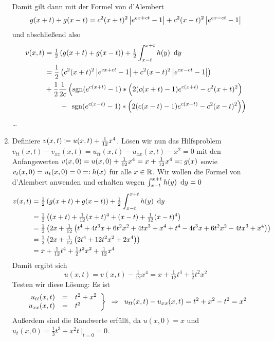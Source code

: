\begin{exercisePage}
\begin{enumerate}[label=(zu \alph*), leftmargin=*]
	Damit gilt dann mit der Formel von d'Alembert
	\begin{equation*}
		g(x+t) + g(x-t) = c^2(x+t)^2 \left| e^{cx + ct} - 1 \right| + c^2(x-t)^2 \left| e^{cx - ct} - 1 \right|
	\end{equation*}
	und abschließend also 
	\begin{align*}
		v(x,t) 
		&= \tfrac{1}{2} \brackets{g(x+t) + g(x-t)} + \tfrac{1}{2} \int_{x-t}^{x+t} h(y) \dy \\
		&= \frac{1}{2} \brackets{c^2(x+t)^2 \abs{e^{cx + ct} - 1} + c^2(x-t)^2 \abs{e^{cx - ct} - 1}}\\
		& + \frac{1}{2}  \frac{1}{2c} \left(\sgn(e^{c(x+t)} - 1) * \brackets{2 (c(x+t) - 1) e^{c(x+t)} - c^2(x+t)^2} \right. \\
		&\phantom{= \frac{1}{2}} \ - \ \left. \sgn(e^{c(x-t)} - 1) * \brackets{2 (c(x-t) - 1) e^{c(x-t)} - c^2(x-t)^2}\right)
	\end{align*}
	\dots
	
	\item Definiere $v(x,t) \coloneqq u(x,t) + \frac{1}{12}x^4$. Lösen wir nun das Hilfsproblem $v_{tt}(x,t) - v_{xx}(x,t) = u_{tt}(x,t) - u_{xx}(x,t) - x^2 = 0$ mit den Anfangswerten $v(x,0) = u(x,0) + \frac{1}{12} x^4 = x + \frac{1}{12}x^4 \mathrel{=:} g(x)$ sowie $v_t(x,0) = u_t(x,0) = 0 \mathrel{=:} h(x)$ für alle $x \in \mathbb{R}$.
	Wir wollen die Formel von d'Alembert anwenden und erhalten wegen $\int_{x-t}^{x+t} h(y) \enskip \mathrm{d}y = 0$
	\begin{align*}
		v(x,t) &= \tfrac{1}{2} \left( g(x+t) + g(x-t) \right) + \tfrac{1}{2} \int_{x-t}^{x+t} h(y) \enskip \mathrm{d}y \\
		&= \tfrac{1}{2} \left(  (x+t) + \tfrac{1}{12}(x+t)^4  + (x-t) + \tfrac{1}{12}(x-t)^4 \right) \\
		&= \tfrac{1}{2} \left( 2x + \tfrac{1}{12} \left( t^4 + 4 t^3 x + 6 t^2 x^2 + 4 t x^3 + x^4 + t^4 - 4 t^3 x + 6 t^2 x^2 - 4 t x^3 + x^4 \right) \right) \\
		&=\tfrac{1}{2} \left( 2x + \tfrac{1}{12} \left( 2t^4 + 12 t^2 x^2 + 2 x^4  \right) \right) \\
		&= x + \tfrac{1}{12}t^4 + \tfrac{1}{2} t^2x^2 + \tfrac{1}{12} x^4
	\end{align*} 
	Damit ergibt sich
	\begin{equation*}
		u(x,t) = v(x,t) - \tfrac{1}{12}x^4 = x + \tfrac{1}{12} t^4 + \tfrac{1}{2} t^2x^2
	\end{equation*}
	Testen wir diese Lösung: Es ist
	\begin{equation*}
		\left.\begin{array}{rcl}
			u_{tt}(x,t) &=& t^2 + x^2 \\
			u_{xx}(x,t) &=& t^2
		\end{array}  \right\}
		\enskip \Rightarrow \enskip u_{tt}(x,t) - u_{xx}(x,t) = t^2 + x^2 - t^2 = x^2
	\end{equation*}
	Außerdem sind die Randwerte erfüllt, da $u(x,0) = x$ und $u_t(x,0) = \frac{1}{3}t^3 + x^2 t \ \big|_{t=0} = 0$.
\end{enumerate}


\end{exercisePage}
